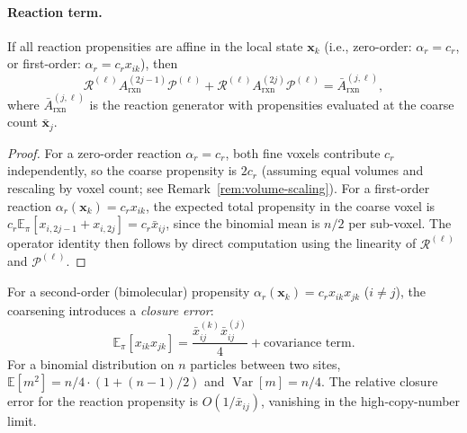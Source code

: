 \documentclass[review,onefignum,onetabnum]{siamart171218}
\newcommand{\bx}{\mathbf{x}}
\newcommand{\calR}{\mathcal{R}}
\newcommand{\calP}{\mathcal{P}}
\newcommand{\E}{\mathbb{E}}
\begin{document}
\paragraph{Reaction term.}
\begin{proposition}
  \label{prop:linear-exact}
  If all reaction propensities are affine in the local state
  $\bx_k$ (i.e., zero-order: $\alpha_r = c_r$, or first-order:
  $\alpha_r = c_r x_{ik}$), then
  \begin{equation}
    \label{eq:linear-exact}
    \calR^{(\ell)} A_{\mathrm{rxn}}^{(2j-1)} \calP^{(\ell)}
    + \calR^{(\ell)} A_{\mathrm{rxn}}^{(2j)} \calP^{(\ell)}
    = \bar{A}_{\mathrm{rxn}}^{(j,\ell)},
  \end{equation}
  where $\bar{A}_{\mathrm{rxn}}^{(j,\ell)}$ is the reaction
  generator with propensities evaluated at the coarse count
  $\bar{\bx}_j$.
\end{proposition}

\begin{proof}
  For a zero-order reaction $\alpha_r = c_r$, both fine voxels
  contribute $c_r$ independently, so the coarse propensity is
  $2c_r$ (assuming equal volumes and rescaling by voxel count;
  see Remark~\ref{rem:volume-scaling}).  For a first-order
  reaction $\alpha_r(\bx_k) = c_r x_{ik}$, the expected total
  propensity in the coarse voxel is
  $c_r \E_\pi[x_{i,2j-1} + x_{i,2j}] = c_r \bar{x}_{ij}$,
  since the binomial mean is $n/2$ per sub-voxel.  The operator
  identity then follows by direct computation using the
  linearity of $\calR^{(\ell)}$ and $\calP^{(\ell)}$.
\end{proof}

\begin{remark}
  \label{rem:closure}
  For a second-order (bimolecular) propensity
  $\alpha_r(\bx_k) = c_r x_{ik} x_{jk}$ ($i \neq j$), the
  coarsening introduces a \emph{closure error}:
  \begin{equation}
    \label{eq:closure-error}
    \E_\pi[x_{ik} x_{jk}] = \frac{\bar{x}_{ij}^{(k)} \bar{x}_{ij}^{(j)}}{4}
      + \text{covariance term}.
  \end{equation}
  For a binomial distribution on $n$ particles between two sites,
  $\E[m^2] = n/4 \cdot (1 + (n-1)/2)$ and
  $\operatorname{Var}[m] = n/4$.  The relative closure error
  for the reaction propensity is $O(1/\bar{x}_{ij})$, vanishing
  in the high-copy-number limit.
\end{remark}
\end{document}
